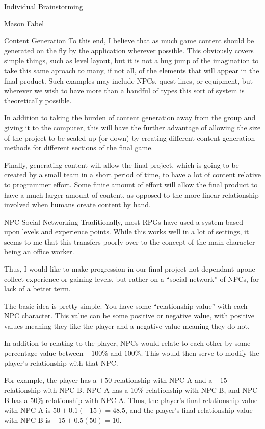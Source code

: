 \documentclass[12pt]{report}
\begin{document}
\begin{section}{Individual Brainstorming}
\begin{subsection}{Mason Fabel}
\begin{subsubsection}{Content Generation}
To this end, I believe that as much game content should be generated on the
fly by the application wherever possible. This obviously covers simple
things, such as level layout, but it is not a hug jump of the imagination
to take this same aproach to many, if not all, of the elements that will
appear in the final product. Such examples may include NPCs, quest lines, or
equipment, but wherever we wish to have more than a handful of types this
sort of system is theoretically possible.

In addition to taking the burden of content generation away from the group
and giving it to the computer, this will have the further advantage of
allowing the size of the project to be scaled up (or down) by creating
different content generation methods for different sections of the final
game.

Finally, generating content will allow the final project, which is going to
be created by a small team in a short period of time, to have a lot of
content relative to programmer effort. Some finite amount of effort will
allow the final product to have a much larger amount of content, as
opposed to the more linear relationship involved when humans create
content by hand.
\end{subsubsection}

\begin{subsubsection}{NPC Social Networking}
Traditionally, most RPGs have used a system based upon levels and
experience points. While this works well in a lot of settings, it seems to
me that this transfers poorly over to the concept of the main character
being an office worker.

Thus, I would like to make progression in our final project not dependant
upone collect experience or gaining levels, but rather on a ``social
network'' of NPCs, for lack of a better term.

The basic idea is pretty simple. You have some ``relationship value''
with each NPC character. This value can be some positive or negative value,
with positive values meaning they like the player and a negative value
meaning they do not.

In addition to relating to the player, NPCs would relate to each other by
some percentage value between $-100\%$ and $100\%$. This would then serve
to modify the player's relationship with that NPC.

For example, the player has a $+50$ relationship with NPC A and a $-15$
relationship with NPC B. NPC A has a $10\%$ relationship with NPC B, and
NPC B has a $50\%$ relationship with NPC A. Thus, the player's final
relationship value with NPC A is $50+0.1(-15)=48.5$, and the player's
final relationship value with NPC B is $-15+0.5(50)=10$.


\end{subsubsection}
\end{subsection}
\end{section}
\end{document}
